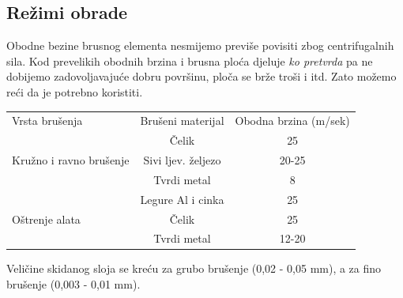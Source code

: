 \documentclass[a4paper,12pt]{article}
\numberwithin{figure}{section}
\begin{document}
\subsection{Režimi obrade}
Obodne bezine brusnog elementa nesmijemo previše povisiti zbog centrifugalnih sila. Kod prevelikih obodnih brzina i brusna ploća djeluje \textit{ko pretvrda} pa ne dobijemo zadovoljavajuće dobru površinu, ploča se brže troši i itd. Zato možemo reći da je potrebno koristiti.
\begin{table}[!h]
\centering
\begin{tabular}{lcc}
Vrsta brušenja          & Brušeni materijal  & Obodna brzina (m/sek) \\
                        & Čelik              & 25                    \\
Kružno i ravno brušenje & Sivi ljev. željezo & 20-25                 \\
                        & Tvrdi metal        & 8                     \\
                        & Legure Al i cinka  & 25                    \\
Oštrenje alata          & Čelik              & 25                    \\
                        & Tvrdi metal        & 12-20                
\end{tabular}
\end{table}
\FloatBarrier
Veličine skidanog sloja se kreću za grubo brušenje (0,02 - 0,05 mm), a za fino brušenje (0,003 - 0,01 mm).
\end{document}
